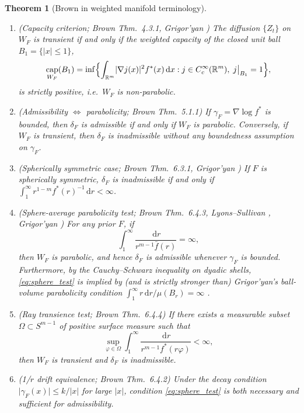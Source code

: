 \documentclass[a4paper,11pt,noarxiv]{quantumarticle}
\newcommand{\R}{\mathbb{R}}
\newcommand{\abs}[1]{\lvert #1\rvert}
\newcommand{\dd}{\,\mathrm{d}}
\newcommand{\grad}{\nabla}
\newcommand{\fbar}{\bar f}
\DeclareMathOperator{\capa}{cap}
\theoremstyle{plain}
\newtheorem{theorem}{Theorem}
\theoremstyle{definition}
\theoremstyle{remark}
\begin{document}
\begin{theorem}[Brown \cite{brown1971} in weighted manifold terminology]
\label{thm:brown}\leavevmode
\begin{enumerate}[label=\textup{(\alph*)},leftmargin=1.8em,itemsep=2pt,topsep=2pt]
\item \textup{(Capacity criterion; Brown Thm.\ 4.3.1, Grigor'yan
\cite[Thm.\ 5.1]{grigoryan1999})} The diffusion $\{Z_t\}$ on $W_F$ is
transient if and only if the weighted capacity of the closed unit ball
$B_1=\{\abs{x}\le1\}$,
\[
\capa_{W_F}(B_1)=\inf\Bigl\{\int_{\R^m}\abs{\grad j(x)}^2f^*(x)\dd x :
j\in C_c^\infty(\R^m),\; j\big|_{B_1}=1\Bigr\},
\]
is strictly positive, i.e.\ $W_F$ is non-parabolic.
\item \textup{(Admissibility $\Leftrightarrow$ parabolicity; Brown Thm.\
5.1.1)} If $\gamma_F=\grad\log f^*$ is bounded, then $\delta_F$ is
admissible if and only if $W_F$ is parabolic. Conversely, if $W_F$ is
transient, then $\delta_F$ is inadmissible without any boundedness
assumption on $\gamma_F$.
\item \textup{(Spherically symmetric case; Brown Thm.\ 6.3.1, Grigor'yan
\cite[Prop.\ 3.1]{grigoryan1999})} If $F$ is spherically symmetric,
$\delta_F$ is inadmissible if and only if
$\int_1^\infty r^{1-m}f^*(r)^{-1}\dd r<\infty$.
\item \textup{(Sphere-average parabolicity test; Brown Thm.\ 6.4.3,
Lyons--Sullivan \cite{lyonssullivan1984}, Grigor'yan \cite{grigoryan1985}
\cite[Thm.\ 7.5]{grigoryan1999})} For any prior $F$, if
\begin{equation}\label{eq:sphere_test}
\int_1^\infty\frac{\dd r}{r^{m-1}\fbar(r)}=\infty,
\end{equation}
then $W_F$ is parabolic, and hence $\delta_F$ is admissible whenever
$\gamma_F$ is bounded. Furthermore, by the Cauchy--Schwarz inequality on
dyadic shells, \eqref{eq:sphere_test} is implied by (and is strictly
stronger than) Grigor'yan's ball-volume parabolicity condition
$\int_1^\infty r\dd r/\mu(B_r)=\infty$ \cite[Thm.\ 7.3]{grigoryan1999}.
\item \textup{(Ray transience test; Brown Thm.\ 6.4.4)} If there exists
a measurable subset $\Omega\subset S^{m-1}$ of positive surface measure
such that
\begin{equation}\label{eq:ray_test}
\sup_{\varphi\in\Omega}\int_1^\infty\frac{\dd r}{r^{m-1}f^*(r\varphi)}<\infty,
\end{equation}
then $W_F$ is transient and $\delta_F$ is inadmissible.
\item \textup{(1/$r$ drift equivalence; Brown Thm.\ 6.4.2)} Under the
decay condition $\abs{\gamma_F(x)}\le k/\abs{x}$ for large $\abs{x}$,
condition \eqref{eq:sphere_test} is both necessary and sufficient for
admissibility.
\end{enumerate}
\end{theorem}
\end{document}
